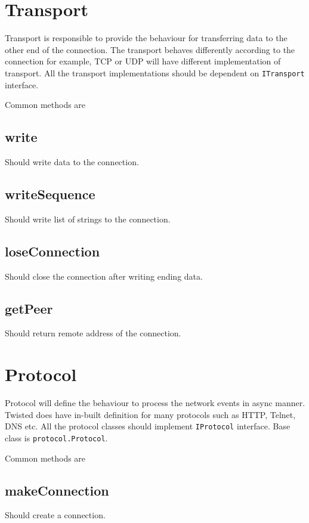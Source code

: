 \documentclass{article}
\begin{document}
  \section{Transport}

    Transport is responsible to provide the behaviour for transferring data to
    the other end of the connection. The transport behaves differently
    according to the connection for example, TCP or UDP will have different
    implementation of transport. All the transport implementations should be
    dependent on \texttt{ITransport} interface.

    Common methods are

    \subsection{write} Should write data to the connection.

    \subsection {writeSequence} Should write list of strings to the connection.

    \subsection{loseConnection} Should close the connection after writing
    ending data.

    \subsection{getPeer} Should return remote address of the connection.

  \section{Protocol}
    Protocol will define the behaviour to process the network events in async
    manner. Twisted does have in-built definition for many protocols such as
    HTTP, Telnet, DNS etc. All the protocol classes should implement
    \texttt{IProtocol} interface. Base class is \texttt{protocol.Protocol}.

    Common methods are

    \subsection{makeConnection} Should create a connection.
\end{document}

